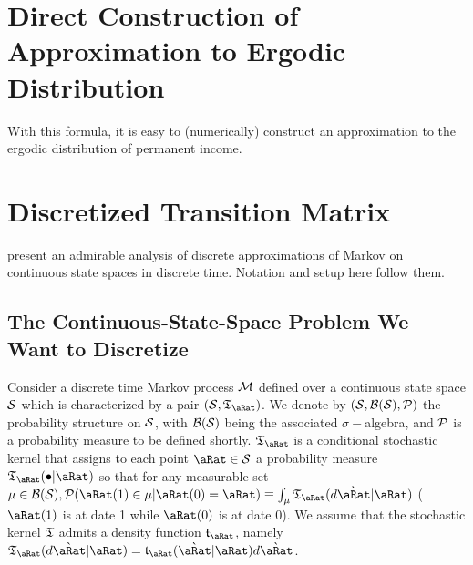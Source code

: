 \documentclass[../BufferStockTheory.tex]{subfiles}\usepackage{ApndxSteadyState}
\begin{document}
  \section{Direct Construction of Approximation to Ergodic Distribution}

  With this formula, it is easy to (numerically) construct an approximation to the ergodic distribution of permanent income.

  \section{Discretized Transition Matrix}

  \cite{eaDiscretize} present an admirable analysis of discrete approximations of Markov on continuous state spaces in discrete time.  Notation and setup here follow them.

  \subsection{The Continuous-State-Space Problem We Want to Discretize} 
  Consider a discrete time Markov process $\Mrkv$ defined over a continuous state space $\DistSetSprtFull$ which is characterized by a pair $(\DistSetSprtFull,\Trns_{\point})$.   We denote by $(\DistSetSprtFull,\Borel(\DistSetSprtFull),\Pcurl)$ the probability structure on $\DistSetSprtFull$, with $\Borel(\DistSetSprtFull)$ being the associated $\sigma-$algebra, and $\Pcurl$ is a probability measure to be defined shortly. $\Trns_{\point}$ is a conditional stochastic kernel  that assigns to each point $\point \in \DistSetSprtFull$ a probability measure $\Trns_{\point}(\bullet|\point)$ so that for any measurable set $\SetSub \in \Borel(\DistSetSprtFull), \Pcurl(\point(1) \in \SetSub|\point(0)=\point) \equiv \int_{\SetSub}\Trns_{\point}(d\Nxt{\point}|\point)$ ($\point(1)$ is at date 1 while $\point(0)$ is at date 0).  We assume that the stochastic kernel $\Trns$ admits a density function $\trns_{\point}$, namely $\Trns_{\point}(d\Nxt{\point}|\point) = \trns_{\point}(\Nxt{\point}|\point)d\Nxt{\point}$.
\end{document}
